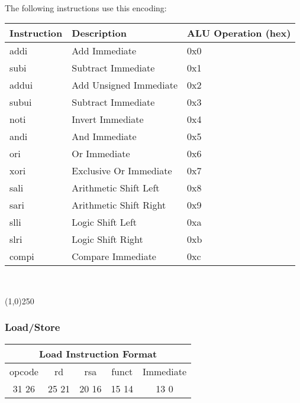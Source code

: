 \documentclass[letterpaper, 11pt]{article}
\begin{document}
\paragraph{}The following instructions use this encoding:
\begin{center}
	\begin{tabular}{|l|l|l|} \hline
			Instruction & Description 						& ALU Operation (hex) \\ \hline
			addi		& Add Immediate						& 0x0 \\ \hline
			subi 		& Subtract Immediate				& 0x1 \\ \hline
			addui 		& Add Unsigned Immediate			& 0x2 \\ \hline
			subui		& Subtract Immediate 				& 0x3 \\ \hline
			noti		& Invert Immediate					& 0x4 \\ \hline
			andi		& And Immediate						& 0x5 \\ \hline
			ori			& Or Immediate						& 0x6 \\ \hline
			xori		& Exclusive Or Immediate			& 0x7 \\ \hline
			sali		& Arithmetic Shift Left				& 0x8 \\ \hline
			sari		& Arithmetic Shift Right			& 0x9 \\ \hline
			slli		& Logic Shift Left 					& 0xa \\ \hline
			slri		& Logic Shift Right					& 0xb \\ \hline
			compi		& Compare Immediate					& 0xc \\ \hline

	\end{tabular} \\
\end{center}
\begin{center}
	\line(1,0){250}
\end{center}

\newpage
\subsubsection{Load/Store}
\begin{center}
		\begin{tabular}{|c|c|c|c|c|}
			\multicolumn{5}{c}{Load Instruction Format}\\ \hline
				\hspace{2pt} opcode \hspace{2pt} & \hspace{5pt} rd \hspace{5pt} &  \hspace{4pt} rsa \hspace{4pt} & \hspace{3pt} funct \hspace{3pt} & \hspace{10pt} Immediate \hspace{10pt}   \\	\hline
				31 \hfill 26& 25 \hfill 21 &20 \hfill  16& 15 \hfill 14  & 13 \hfill 0\\ \hline
		
	\end{tabular}
\end{center}
\end{document}
